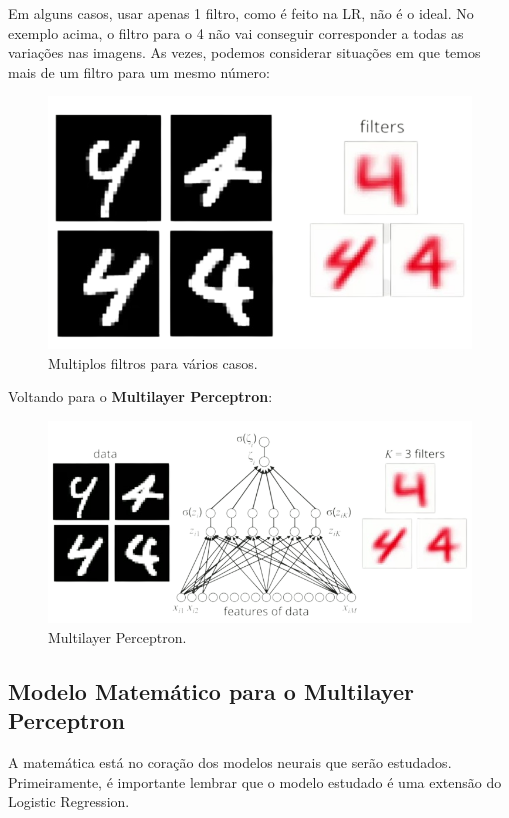\documentclass[11pt, a4paper]{article}
\begin{document}
Em alguns casos, usar apenas 1 filtro, como é feito na LR, não é o ideal. No exemplo acima, o filtro para o 4 não vai conseguir corresponder a todas as variações nas imagens. As vezes, podemos considerar situações em que temos mais de um filtro para um mesmo número:

\begin{figure}[h]
\centering
\includegraphics[scale=0.3]{4thMTP}
\caption{Multiplos filtros para vários casos.}
\end{figure}

Voltando para o \textbf{Multilayer Perceptron}:

\begin{figure}[h]
\centering
\includegraphics[scale=0.3]{5thMTP}
\caption{Multilayer Perceptron.}
\end{figure}

\subsection{Modelo Matemático para o Multilayer Perceptron}

A matemática está no coração dos modelos neurais que serão estudados. Primeiramente, é importante lembrar que o modelo estudado é uma extensão do Logistic Regression.
\end{document}
